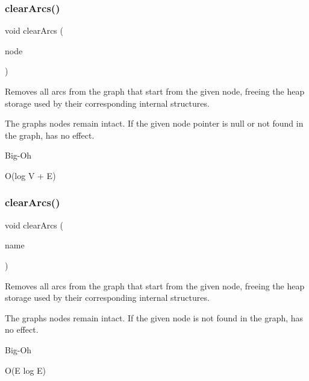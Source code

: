 \subsubsection{\texorpdfstring{clear\+Arcs()}{clearArcs()}\hspace{0.1cm}{\footnotesize\ttfamily [2/3]}}
{\footnotesize\ttfamily void clear\+Arcs (\begin{DoxyParamCaption}\item[{\mbox{\hyperlink{classVertexGen}{Vertex\+Gen}}$<$ V, E $>$  $\ast$}]{node }\end{DoxyParamCaption})\hspace{0.3cm}{\ttfamily [inherited]}}



Removes all arcs from the graph that start from the given node, freeing the heap storage used by their corresponding internal structures. 

The graph\textquotesingle{}s nodes remain intact. If the given node pointer is null or not found in the graph, has no effect. \begin{DoxyRefDesc}{Big-\/\+Oh}
\item[\mbox{\hyperlink{BigOh__BigOh000051}{Big-\/\+Oh}}]O(log V + E) \end{DoxyRefDesc}
\mbox{\label{classGraph_a2d8ecb9c6768fff244b2be46319385cc}} 
\subsubsection{\texorpdfstring{clear\+Arcs()}{clearArcs()}\hspace{0.1cm}{\footnotesize\ttfamily [3/3]}}
{\footnotesize\ttfamily void clear\+Arcs (\begin{DoxyParamCaption}\item[{const std\+::string \&}]{name }\end{DoxyParamCaption})\hspace{0.3cm}{\ttfamily [inherited]}}



Removes all arcs from the graph that start from the given node, freeing the heap storage used by their corresponding internal structures. 

The graph\textquotesingle{}s nodes remain intact. If the given node is not found in the graph, has no effect. \begin{DoxyRefDesc}{Big-\/\+Oh}
\item[\mbox{\hyperlink{BigOh__BigOh000052}{Big-\/\+Oh}}]O(\+E log E) \end{DoxyRefDesc}
\mbox{\label{classBasicGraphGen_aced46bbfe5973602cbd67ac6188c36db}} 
